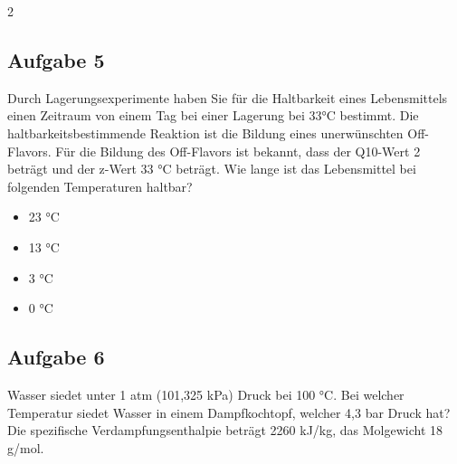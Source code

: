 \documentclass[a4paper,10pt]{article}
\newif\ifshowme
\begin{document}
\begin{multicols}{2}
\subsection*{Aufgabe 5}
Durch Lagerungsexperimente haben Sie für die Haltbarkeit eines Lebensmittels einen Zeitraum von einem Tag bei einer Lagerung bei 33°C bestimmt. Die haltbarkeitsbestimmende Reaktion ist die Bildung eines unerwünschten Off-Flavors. Für die Bildung des Off-Flavors ist bekannt, dass der Q10-Wert 2 beträgt und der z-Wert 33 °C beträgt. Wie lange ist das Lebensmittel bei folgenden Temperaturen haltbar?
\begin{itemize}
\item 23 °C
\item 13 °C
\item 3 °C
\item 0 °C
\end{itemize}
\ifshowme
\antwort{
\begin{align*}
2, 4, 8, 10
\end{align*}
}
\else
\fi

\subsection*{Aufgabe 6}
Wasser siedet unter 1 atm (101,325 kPa) Druck bei 100 °C. Bei welcher Temperatur siedet
Wasser in einem Dampfkochtopf, welcher 4,3 bar Druck hat? Die spezifische
Verdampfungsenthalpie beträgt 2260 kJ/kg, das Molgewicht 18 g/mol.
\ifshowme
\antwort{
\footnotesize
\begin{align*}
\ln(\frac{p_2}{p_1}) \cdot \frac{R}{\Delta h_{vM}}+\frac{1}{T_2}&=\frac{1}{T_1} \\
\ln(\frac{10,1325}{43}) \cdot \frac{8,314 ~\text{J/(mol K)}}{2,26 \cdot 10^6 \cdot 0,018}+\frac{1}{373,15}&=2,3845 \cdot 10^{-3} \\ 
&=419,38 ~\text{K}\\
&=146,23 ~\text{°C}
\end{align*} 

}
\else
\fi
\end{multicols}
\end{document}
